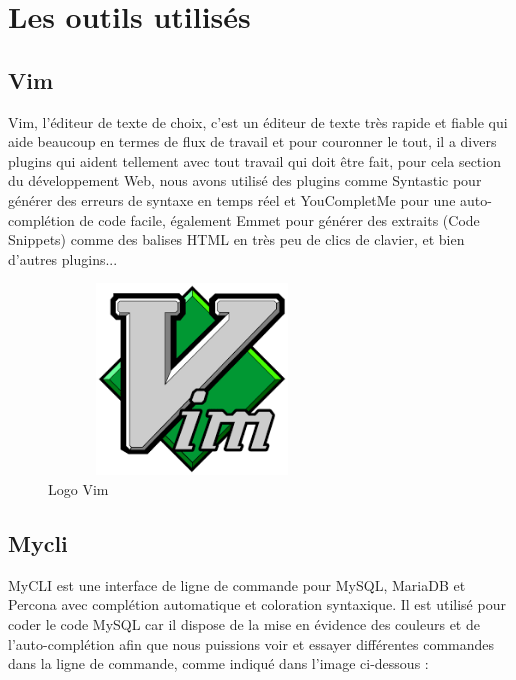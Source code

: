 \documentclass[12pt]{report}
\begin{document}
\section{Les outils utilisés}

\subsection{Vim}

Vim, l'éditeur de texte de choix, c'est un éditeur de texte très rapide et fiable qui aide beaucoup en termes de flux de travail et pour couronner le tout, il a divers plugins qui aident tellement avec tout travail qui doit être fait, pour cela section du développement Web, nous avons utilisé des plugins comme Syntastic pour générer des erreurs de syntaxe en temps réel et YouCompletMe pour une auto-complétion de code facile, également Emmet pour générer des extraits (Code Snippets) comme des balises HTML en très peu de clics de clavier, et bien d'autres plugins...

\vspace{0.1in}

\begin{figure}[h]
\centering
    \includegraphics[width = 3in, height = 2in]{../Images/Vim.png}
\vspace{0.0in}
\caption{Logo Vim}
\end{figure}

\vspace{-0.15in}

\subsection{Mycli}

MyCLI est une interface de ligne de commande pour MySQL, MariaDB et Percona avec complétion automatique et coloration syntaxique. Il est utilisé pour coder le code MySQL car il dispose de la mise en évidence des couleurs et de l'auto-complétion afin que nous puissions voir et essayer différentes commandes dans la ligne de commande, comme indiqué dans l'image ci-dessous :
\end{document}

